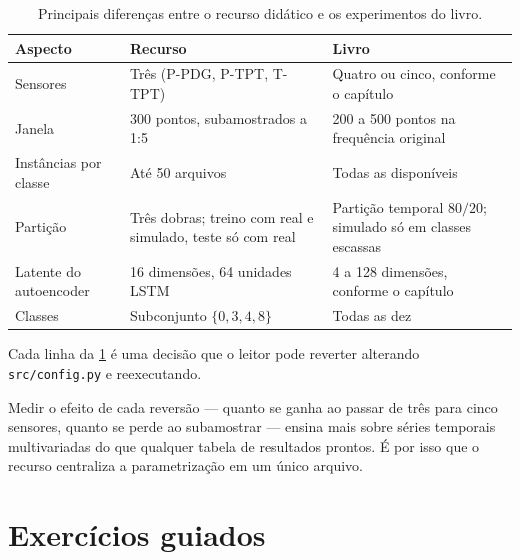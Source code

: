 \begin{table}[htbp]
\centering
\caption{Principais diferenças entre o recurso didático e os experimentos do livro.}
\label{tab:pratica-diferencas}
\small
\begin{tabular}{p{3.2cm}p{3.9cm}p{4.5cm}}
\toprule
\textbf{Aspecto} & \textbf{Recurso} & \textbf{Livro} \\
\midrule
Sensores & Três (P-PDG, P-TPT, T-TPT) &
Quatro ou cinco, conforme o capítulo \\
\addlinespace
Janela & 300 pontos, subamostrados a 1:5 &
200 a 500 pontos na frequência original \\
\addlinespace
Instâncias por classe & Até 50 arquivos &
Todas as disponíveis \\
\addlinespace
Partição & Três dobras; treino com real e simulado, teste só com real &
Partição temporal $80/20$; simulado só em classes escassas \\
\addlinespace
Latente do autoencoder & 16 dimensões, 64 unidades LSTM &
4 a 128 dimensões, conforme o capítulo \\
\addlinespace
Classes & Subconjunto $\{0,3,4,8\}$ &
Todas as dez \\
\bottomrule
\end{tabular}
\end{table}

\begin{destaque}
Cada linha da \cref{tab:pratica-diferencas} é uma decisão que o leitor pode reverter
alterando \texttt{src/config.py} e reexecutando.

Medir o efeito de cada reversão --- quanto se ganha ao passar de três para cinco sensores,
quanto se perde ao subamostrar --- ensina mais sobre séries temporais multivariadas do que
qualquer tabela de resultados prontos. É por isso que o recurso centraliza a
parametrização em um único arquivo.
\end{destaque}

\section{Exercícios guiados}

